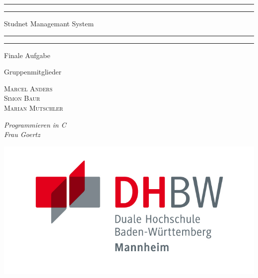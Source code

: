 \documentclass[a4paper, 11pt, oneside]{book} %
\begin{document}
 

\begin{titlepage} 
	\centering 
	\scshape 
	\vspace*{\baselineskip} 
	
	\rule{\textwidth}{1.6pt}\vspace*{-\baselineskip}\vspace*{2pt} 
	\rule{\textwidth}{0.4pt}
	
	\vspace{0.75\baselineskip} 
	
	{\LARGE Studnet Managemant System} %
	
	\vspace{0.75\baselineskip} 
	
	\rule{\textwidth}{0.4pt}\vspace*{-\baselineskip}\vspace{3.2pt} 
	\rule{\textwidth}{1.6pt} 
	
	\vspace{2\baselineskip} 
	
	
	Finale Aufgabe %
	
	\vspace*{3\baselineskip}
	
	
	Gruppenmitglieder
	
	\vspace{0.5\baselineskip} 
	
	{\scshape\Large Marcel Anders \\ Simon Baur \\ Marian Mutschler}
	
	\vspace{0.8\baselineskip}
	
	\textit{Programmieren in C \\ Frau Goertz}
	
	\vfill %
	
	
    \includegraphics{assets/DHBW_MA_Logo.jpg}
	

\end{titlepage}
\end{document}
